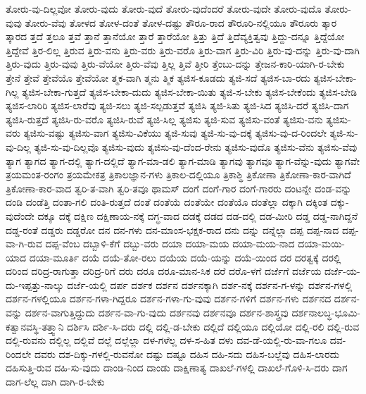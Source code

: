 {ತೋರು-ವು-ದಿಲ್ಲವೋ
ತೋರು-ವುದು
ತೋರು-ವುದೆ
ತೋರು-ವುದೆಂದರೆ
ತೋರು-ವುದೇ
ತೋರು-ವುದೊ
ತೋರು-ವುವು
ತೋರು-ವೆವು
ತೋಳದ
ತೋಳ-ದಂತೆ
ತೋಳ-ದಷ್ಟು
ತೌರೂ-ರಾದ
ತೌರೂರಿ-ನಲ್ಲಿಯೂ
ತೌರೂರು
ತ್ಕಾರ
ತ್ಕಾರದ
ತ್ತದೆ
ತ್ತಲೂ
ತ್ತವೆ
ತ್ತಾನೆ
ತ್ತಾನೆಯೋ
ತ್ತಾರೆ
ತ್ತಾರೆಯೋ
ತ್ತಿತ್ತು
ತ್ತಿದೆ
ತ್ತಿದೆವ್ಯಕ್ತಿತ್ವವು
ತ್ತಿದ್ದು-ದನ್ನೂ
ತ್ತಿದ್ದೆಯೋ
ತ್ತಿದ್ದೇವೆ
ತ್ತಿರ-ಲಿಲ್ಲ
ತ್ತಿರುವ
ತ್ತಿರು-ವನು
ತ್ತಿರು-ವರು
ತ್ತಿರು-ವರೊ
ತ್ತಿರು-ವಾಗ
ತ್ತಿರು-ವಿರಿ
ತ್ತಿರು-ವು-ದನ್ನು
ತ್ತಿರು-ವು-ದಾಗಿ
ತ್ತಿರು-ವುದು
ತ್ತಿರು-ವುವು
ತ್ತಿರು-ವೆಯೋ
ತ್ತಿರು-ವೆವು
ತ್ತಿಲ್ಲ
ತ್ತಿವೆ
ತ್ತೀರಿ
ತ್ತೆಂಬು-ದನ್ನು
ತ್ತೇಜನ-ಕಾರಿ-ಯಾಗಿ-ರ-ಬೇಕು
ತ್ತೇನೆ
ತ್ತೇವೆ
ತ್ತೇವೆಯೊ
ತ್ತೇವೆಯೋ
ತ್ಮಕ-ವಾಗಿ
ತ್ಮನು
ತ್ಮಿಕ
ತ್ಯಜಿಸ-ಕೂಡದು
ತ್ಯಜಿ-ಸದೆ
ತ್ಯಜಿಸ-ಬಾ-ರದು
ತ್ಯಜಿಸ-ಬೇಕಾ-ಗಿಲ್ಲ
ತ್ಯಜಿಸ-ಬೇಕಾ-ಗುತ್ತದೆ
ತ್ಯಜಿಸ-ಬೇಕಾ-ದುದು
ತ್ಯಜಿಸ-ಬೇಕಾ-ಯಿತು
ತ್ಯಜಿ-ಸ-ಬೇಕು
ತ್ಯಜಿಸ-ಬೇಕೆಂದು
ತ್ಯಜಿಸ-ಬೇಡಿ
ತ್ಯಜಿಸ-ಲಾರಿರಿ
ತ್ಯಜಿಸ-ಲಾರೆವು
ತ್ಯಜಿ-ಸಲು
ತ್ಯಜಿ-ಸಲ್ಪಡುತ್ತವೆ
ತ್ಯಜಿಸಿ
ತ್ಯಜಿ-ಸಿತು
ತ್ಯಜಿ-ಸಿದ
ತ್ಯಜಿಸಿ-ದರೆ
ತ್ಯಜಿಸಿ-ದಾಗ
ತ್ಯಜಿಸಿ-ರುತ್ತದೆ
ತ್ಯಜಿಸಿ-ರು-ವರೊ
ತ್ಯಜಿಸಿ-ರುವೆ
ತ್ಯಜಿ-ಸಿಲ್ಲ
ತ್ಯಜಿಸು
ತ್ಯಜಿ-ಸುವ
ತ್ಯಜಿಸು-ವಂತೆ
ತ್ಯಜಿಸು-ವನು
ತ್ಯಜಿಸು-ವರು
ತ್ಯಜಿಸು-ವಷ್ಟು
ತ್ಯಜಿಸು-ವಾಗ
ತ್ಯಜಿಸು-ವಿಕೆಯು
ತ್ಯಜಿ-ಸುವು
ತ್ಯಜಿ-ಸು-ವು-ದಕ್ಕೆ
ತ್ಯಜಿಸು-ವು-ದ-ರಿಂದಲೇ
ತ್ಯಜಿ-ಸು-ವು-ದಿಲ್ಲ
ತ್ಯಜಿ-ಸು-ವು-ದಿಲ್ಲವೊ
ತ್ಯಜಿಸು-ವುದು
ತ್ಯಜಿಸು-ವು-ದೆಂದ-ರೇನು
ತ್ಯಜಿಸು-ವುದೊ
ತ್ಯಜಿಸು-ವೆನು
ತ್ಯಜಿಸು-ವೆವು
ತ್ಯಾಗ
ತ್ಯಾಗದ
ತ್ಯಾಗ-ದಲ್ಲಿ
ತ್ಯಾಗ-ದಲ್ಲಿದೆ
ತ್ಯಾಗ-ಮಾ-ಡಲಿ
ತ್ಯಾಗ-ಮಾಡಿ
ತ್ಯಾಗವು
ತ್ಯಾಗವೂ
ತ್ಯಾಗ-ವೆನ್ನು-ವುದು
ತ್ಯಾಗವೇ
ತ್ರಯಮಂತ-ರಂಗಂ
ತ್ರಯಮೇಕತ್ರ
ತ್ರಿಕಾಲಜ್ಞಾನ-ಗಳು
ತ್ರಿಕಾಲ-ದಲ್ಲಿಯೂ
ತ್ರಿಕಾಶ್ಥಿ
ತ್ರಿಕೋಣಾ
ತ್ರಿಕೋಣಾ-ಕಾರ-ವಾಗಿದೆ
ತ್ರಿಕೋಣಾ-ಕಾರ-ವಾದ
ತ್ವರಿ-ತ-ವಾಗಿ
ತ್ವರಿ-ತವೂ
ಥಾಮಸ್
ದಂಗೆ
ದಂಗೆ-ಗಾರ
ದಂಗೆ-ಗಾರರು
ದಂಟನ್ನೇ
ದಂಡ-ವನ್ನು
ದಂಡಿ
ದಂಡೆತ್ತಿ
ದಂತಾ-ಗಲಿ
ದಂತಿ-ರುತ್ತದೆ
ದಂತೆ
ದಂತೆಯೆ
ದಂತೆಯೇ
ದಂತೆಯೊ
ದಂತೆಲ್ಲಾ
ದಕ್ಕಾಗಿ
ದಕ್ಕಿಂತ
ದಕ್ಕು-ವುದೆಂದೇ
ದಕ್ಕೂ
ದಕ್ಕೆ
ದಕ್ಷಿಣ
ದಕ್ಷಿಣಾಯ-ನಕ್ಕೆ
ದಗ್ಧ-ವಾದ
ದಡಕ್ಕೆ
ದಡದ
ದಡ-ದಲ್ಲಿ
ದಡ-ಮೀರಿ
ದಡ್ಡ
ದಡ್ಡ-ನಾಗಿದ್ದನೆ
ದಡ್ಡ-ರಂತೆ
ದಡ್ಡರು
ದಡ್ಡರೋ
ದನ
ದನ-ಗಳು
ದನ-ಮಾಂಸ-ಭಕ್ಷಕ-ರಾದ
ದನು
ದನ್ನು
ದನ್ನೆಲ್ಲಾ
ದಪ್ಪ
ದಪ್ಪ-ನಾದ
ದಪ್ಪ-ವಾ-ಗಿ-ರುವ
ದಪ್ಪ-ವೆಂಬ
ದಬ್ಬಾಳಿ-ಕೆಗೆ
ದಬ್ಬು-ವರು
ದಯಾ
ದಯಾ-ಮಯ
ದಯಾ-ಮಯ-ನಾದ
ದಯಾ-ಮಯಿ-ಯಾದ
ದಯಾ-ಮೂರ್ತಿ
ದಯೆ
ದಯೆ-ತೋ-ರಲು
ದಯೆಯ
ದಯೆ-ಯನ್ನು
ದಯೆ-ಯಿಂದ
ದರ
ದರತ್ವಕ್ಕೆ
ದರಲ್ಲಿ
ದರಿಂದ
ದರಿದ್ರ-ರಾಗುತ್ತಾ
ದರಿದ್ರ-ರಿಗೆ
ದರು
ದರೂ
ದರೂ-ಮಾನ-ಸಿಕ
ದರೆ
ದರೊ-ಳಗೆ
ದರ್ಜೆಗೆ
ದರ್ಜೆಯ
ದರ್ಜೆ-ಯ-ದು-ಇಪ್ಪತ್ತು-ನಾಲ್ಕು
ದರ್ಜೆ-ಯಲ್ಲಿ
ದರ್ಪ
ದರ್ಶಕ
ದರ್ಶನ
ದರ್ಶನಕ್ಕಾಗಿ
ದರ್ಶ-ನಕ್ಕೆ
ದರ್ಶನ-ಗ-ಳನ್ನು
ದರ್ಶನ-ಗಳಲ್ಲಿ
ದರ್ಶನ-ಗಳಲ್ಲಿಯೂ
ದರ್ಶನ-ಗಳಾ-ಗಿದ್ದರೂ
ದರ್ಶನ-ಗಳಾ-ಗು-ವುವು
ದರ್ಶನ-ಗಳಿಗೆ
ದರ್ಶನ-ಗಳು
ದರ್ಶನದ
ದರ್ಶನ-ವನ್ನು
ದರ್ಶನ-ವಾಗುತ್ತಿದ್ದುದು
ದರ್ಶನ-ವಾ-ಗು-ವುದು
ದರ್ಶನವು
ದರ್ಶನವೂ
ದರ್ಶನ-ಶಾಸ್ತ್ರವು
ದರ್ಶನಾಲಬ್ಧ-ಭೂಮಿ-ಕತ್ವಾನವಸ್ಥಿ-ತತ್ತ್ವಾನಿ
ದರ್ಶಿಸಿ
ದರ್ಶಿ-ಸಿ-ದರು
ದಲ್ಲಿ
ದಲ್ಲಿ-ಡ-ಬೇಕು
ದಲ್ಲಿದೆ
ದಲ್ಲಿಯೂ
ದಲ್ಲಿಯೋ
ದಲ್ಲಿ-ರಲಿ
ದಲ್ಲಿ-ರುವ
ದಲ್ಲಿ-ರುವನು
ದಲ್ಲಿಲ್ಲ
ದಲ್ಲಿವೆ
ದಲ್ಲೆ
ದಲ್ಲೆಲ್ಲಾ
ದಳ-ಗಳೆಲ್ಲ
ದಳ-ಸ-ಹಿತ
ದಳು
ದವ-ಡೆ-ಯಲ್ಲಿ-ರು-ವಾ-ಗಲೂ
ದವ-ರಿಂದಲೇ
ದವರು
ದಶ-ದಿಕ್ಕು-ಗಳಲ್ಲಿ-ರುವನೋ
ದಷ್ಟು
ದಷ್ಟೂ
ದಹಿಸ
ದಹಿ-ಸದು
ದಹಿಸ-ಬಲ್ಲೆವು
ದಹಿಸ-ಲಾರದು
ದಹಿಸುತ್ತಿ-ರುವ
ದಹಿ-ಸು-ವುದು
ದಾಂಡಿ-ನಿಂದ
ದಾಂಡು
ದಾಕ್ಷಿಣಾತ್ಯ
ದಾಖಲೆ-ಗಳಲ್ಲಿ
ದಾಖಲೆ-ಗೊಳಿ-ಸಿ-ದರು
ದಾಗ
ದಾಗ-ಲೆಲ್ಲ
ದಾಗಿ
ದಾಗಿ-ರ-ಬೇಕು
}
